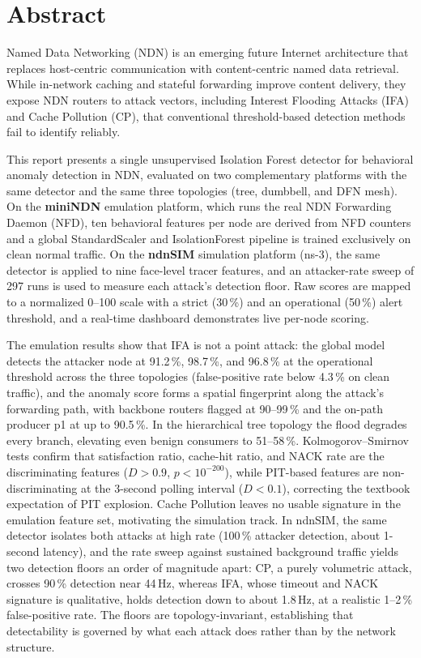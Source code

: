 \documentclass[12pt]{report}
\begin{document}
\chapter*{Abstract}

Named Data Networking (NDN) is an emerging future Internet architecture that replaces host-centric communication with content-centric named data retrieval. While in-network caching and stateful forwarding improve content delivery, they expose NDN routers to attack vectors, including Interest Flooding Attacks (IFA) and Cache Pollution (CP), that conventional threshold-based detection methods fail to identify reliably.

This report presents a single unsupervised Isolation Forest detector for behavioral anomaly detection in NDN, evaluated on two complementary platforms with the same detector and the same three topologies (tree, dumbbell, and DFN mesh). On the \textbf{miniNDN} emulation platform, which runs the real NDN Forwarding Daemon (NFD), ten behavioral features per node are derived from NFD counters and a global StandardScaler and IsolationForest pipeline is trained exclusively on clean normal traffic. On the \textbf{ndnSIM} simulation platform (ns-3), the same detector is applied to nine face-level tracer features, and an attacker-rate sweep of 297 runs is used to measure each attack's detection floor. Raw scores are mapped to a normalized 0--100 scale with a strict (30\,\%) and an operational (50\,\%) alert threshold, and a real-time dashboard demonstrates live per-node scoring.

The emulation results show that IFA is not a point attack: the global model detects the attacker node at 91.2\,\%, 98.7\,\%, and 96.8\,\% at the operational threshold across the three topologies (false-positive rate below 4.3\,\% on clean traffic), and the anomaly score forms a spatial fingerprint along the attack's forwarding path, with backbone routers flagged at 90--99\,\% and the on-path producer p1 at up to 90.5\,\%. In the hierarchical tree topology the flood degrades every branch, elevating even benign consumers to 51--58\,\%. Kolmogorov--Smirnov tests confirm that satisfaction ratio, cache-hit ratio, and NACK rate are the discriminating features ($D>0.9$, $p<10^{-200}$), while PIT-based features are non-discriminating at the 3-second polling interval ($D<0.1$), correcting the textbook expectation of PIT explosion. Cache Pollution leaves no usable signature in the emulation feature set, motivating the simulation track. In ndnSIM, the same detector isolates both attacks at high rate (100\,\% attacker detection, about 1-second latency), and the rate sweep against sustained background traffic yields two detection floors an order of magnitude apart: CP, a purely volumetric attack, crosses 90\,\% detection near 44\,Hz, whereas IFA, whose timeout and NACK signature is qualitative, holds detection down to about 1.8\,Hz, at a realistic 1--2\,\% false-positive rate. The floors are topology-invariant, establishing that detectability is governed by what each attack does rather than by the network structure.
\end{document}
